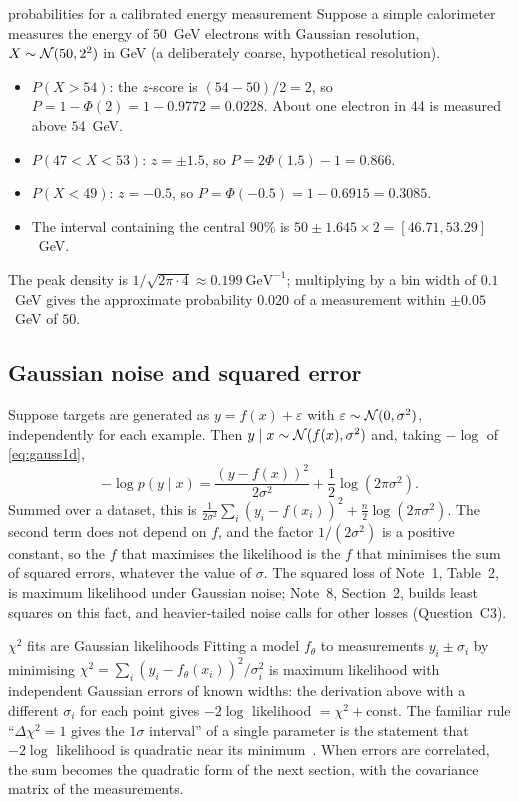 \documentclass[11pt]{article}
\begin{document}
\begin{worked}{probabilities for a calibrated energy measurement}
Suppose a simple calorimeter measures the energy of $50$~GeV electrons with Gaussian resolution, $X \sim
\mathcal{N}(50, 2^2)$ in GeV (a deliberately coarse, hypothetical resolution).
\begin{itemize}
\item $P(X > 54)$: the $z$-score is $(54 - 50)/2 = 2$, so $P = 1 - \Phi(2) = 1 - 0.9772 = 0.0228$. About one
electron in 44 is measured above $54$~GeV.
\item $P(47 < X < 53)$: $z = \pm 1.5$, so $P = 2\Phi(1.5) - 1 = 0.866$.
\item $P(X < 49)$: $z = -0.5$, so $P = \Phi(-0.5) = 1 - 0.6915 = 0.3085$.
\item The interval containing the central 90\% is $50 \pm 1.645 \times 2 = [46.71, 53.29]$~GeV.
\end{itemize}
The peak density is $1/\sqrt{2\pi \cdot 4} \approx 0.199\ \mathrm{GeV}^{-1}$; multiplying by a bin width of
$0.1$~GeV gives the approximate probability $0.020$ of a measurement within $\pm 0.05$~GeV of $50$.
\end{worked}

\subsection{Gaussian noise and squared error}\label{sec:noise}

Suppose targets are generated as $y = f(x) + \varepsilon$ with $\varepsilon \sim \mathcal{N}(0, \sigma^2)$, independently
for each example. Then $y \mid x \sim \mathcal{N}(f(x), \sigma^2)$ and, taking $-\log$ of \eqref{eq:gauss1d},
\[
  -\log p(y \mid x) = \frac{(y - f(x))^2}{2\sigma^2} + \frac12 \log(2\pi\sigma^2) .
\]
Summed over a dataset, this is $\frac{1}{2\sigma^2}\sum_i (y_i - f(x_i))^2 + \frac{n}{2}\log(2\pi\sigma^2)$. The
second term does not depend on $f$, and the factor $1/(2\sigma^2)$ is a positive constant, so the $f$ that
maximises the likelihood is the $f$ that minimises the sum of squared errors, whatever the value of $\sigma$. The
squared loss of Note~1, Table~2, is maximum likelihood under Gaussian noise; Note~8, Section~2, builds least squares
on this fact, and heavier-tailed noise calls for other losses (Question~C3).

\begin{physics}{$\chi^2$ fits are Gaussian likelihoods}
Fitting a model $f_\theta$ to measurements $y_i \pm \sigma_i$ by minimising $\chi^2 = \sum_i (y_i -
f_\theta(x_i))^2 / \sigma_i^2$ is maximum likelihood with independent Gaussian errors of known widths: the derivation
above with a different $\sigma_i$ for each point gives $-2\log$ likelihood $= \chi^2 + {}$const. The familiar
rule ``$\Delta\chi^2 = 1$ gives the $1\sigma$ interval'' of a single parameter is the statement that $-2\log$ likelihood is quadratic
near its minimum~\cite{cowan1998}. When errors are correlated, the sum becomes the quadratic form of the next
section, with the covariance matrix of the measurements.
\end{physics}
\end{document}
